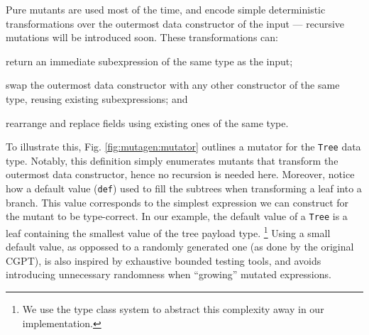 \documentclass[sigconf, anonymous, review]{acmart}
\newcommand{\mutagen}{\textsc{Mutagen}\xspace}
\begin{document}
Pure mutants are used most of the time, and encode simple deterministic
transformations over the outermost data constructor of the input --- recursive
mutations will be introduced soon.
%
These transformations can:
%
\begin{inparaenum}
\item return an immediate subexpression of the same type as the input;
\item swap the outermost data constructor with any other constructor of the
  same type, reusing existing subexpressions; and
\item rearrange and replace fields using existing ones of the same type.
\end{inparaenum}
%
To illustrate this, Fig. \ref{fig:mutagen:mutator} outlines a mutator for the
\texttt{Tree} data type.
%
Notably, this definition simply enumerates mutants that transform the outermost
data constructor, hence no recursion is needed here.
%
Moreover, notice how a default value (\texttt{def}) used to fill the subtrees
when transforming a leaf into a branch.
%
This value corresponds to the simplest expression we can construct for the
mutant to be type-correct.
%
In our example, the default value of a \texttt{Tree} is a leaf containing the
smallest value of the tree payload type.
%
\footnote{We use the type class system to abstract this complexity away in our
  implementation.}
%
Using a small default value, as oppossed to a randomly generated one (as done by
the original CGPT), is also inspired by exhaustive bounded testing tools, and
avoids introducing unnecessary randomness when ``growing'' mutated expressions.

\end{document}
